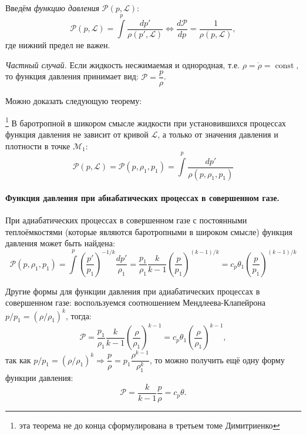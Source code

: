 Введём \emph{функцию давления} $\mathcal{P} (p, \mathcal{L})$:
\[
  \mathcal{P} (p, \mathcal{L}) = \int\limits^p \dfrac{dp'}{\rho(p', \mathcal{L})}
  \Leftrightarrow
  \dfrac{d\mathcal{P}}{dp} = \dfrac{1}{\rho(p, \mathcal{L})},
\]
где нижний предел не важен.

\textit{Частный случай.} Если жидкость несжимаемая и однородная, т.е. $\rho = \mathring{\rho} = \operatorname{const}$, то функция давления принимает вид: $\mathcal{P} = \dfrac{p}{\rho}$.

Можно доказать следующую теорему:
\begin{theorem}\footnote{эта теорема не до конца сформулирована в третьем томе Димитриенко}
  В баротропной в шикором смысле жидкости при установившихся процессах
  функция давления не зависит от кривой $\mathcal{L}$, а только от значения давления
  и плотности в точке $\mathcal{M}_1$:
  \[
    \mathcal{P}(p, \mathcal{L}) = \mathcal{P}(p, \rho_1, p_1) = \int\limits^p \dfrac{dp'}{\rho(p, \rho_1, p_1)}
  \]
\end{theorem}

\paragraph{Функция давления при абиабатических процессах в совершенном газе.}
При адиабатических процессах в совершенном газе с постоянными теплоёмкостями (которые
являются баротропными в широком смысле) функция давления может быть найдена:
\[
  \mathcal{P}(p, \rho_1, p_1) = \int\limits^p \left( \dfrac{p'}{p_1} \right)^{- 1/k} \dfrac{dp'}{\rho_1} = \dfrac{p_1}{\rho_1} \dfrac{k}{k-1} \left( \dfrac{p}{p_1} \right)^{(k-1)/k} =
  c_p \theta_1 \left( \dfrac{p}{p_1} \right)^{(k-1)/k}
\]

Другие формы для функции давления при адиабатических процессах в совершенном газе:
воспользуемся соотношением Мендлеева-Клапейрона $p / p_1 = \left( \rho / \rho_1 \right)^k $,
тогда:
\[
  \mathcal{P} = \dfrac{p_1}{\rho_1} \dfrac{k}{k-1} \left( \dfrac{\rho}{\rho_1} \right)^{k-1} =
  c_p \theta_1 \left( \dfrac{\rho}{\rho_1} \right)^{k-1},
\]
так как $p / p_1 = \left( \rho / \rho_1 \right)^k \Rightarrow \dfrac{p}{\rho} = p_1 \dfrac{\rho^{k-1}}{\rho_1^k}$, то можно получить ещё одну форму функции давления:
\[
  \mathcal{P} = \dfrac{k}{k-1} \dfrac{p}{\rho} = c_p \theta.
\]

